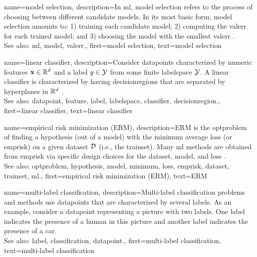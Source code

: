 {name={model selection},
	description={In \gls{ml}, \gls{model} selection refers to the 
		process of choosing between different candidate \glspl{model}. In its most 
		basic form, \gls{model} selection amounts to: 1) training each candidate \gls{model}; 
		2) computing the \gls{valerr} for each trained \gls{model}; and 3) choosing the \gls{model} 
		with the smallest \gls{valerr} \cite[Ch. 6]{MLBasics}. 
				\\
		See also: \gls{ml}, \gls{model}, \gls{valerr}.},
	first={model selection},
	text={model selection}  
}


{name={linear classifier}, 
	description={Consider \glspl{datapoint} characterized by numeric \glspl{feature} ${\bf x} \in \mathbb{R}^{d}$ 
	    	and a \gls{label} $y \in \mathcal{Y}$ from some finite \gls{labelspace} $\mathcal{Y}$. 
		A linear \gls{classifier} is characterized by having \glspl{decisionregion} that are 
		separated by hyperplanes in $\mathbb{R}^{d}$ \cite[Ch. 2]{MLBasics}.
				\\
		See also: \gls{datapoint}, \gls{feature}, \gls{label}, \gls{labelspace}, \gls{classifier}, \gls{decisionregion}.},
	first={linear classifier},
	text={linear classifier} 
}


{name={empirical risk minimization (ERM)}, 
	description={ERM is the \gls{optproblem} of finding 
		a \gls{hypothesis} (out of a \gls{model}) with the \gls{minimum} average \gls{loss} (or \gls{emprisk}) on a given \gls{dataset} 
		$\mathcal{D}$ (i.e., the \gls{trainset}). Many \gls{ml} methods are obtained from 
		\gls{emprisk} via specific design choices for the \gls{dataset}, \gls{model}, and \gls{loss} \cite[Ch. 3]{MLBasics}.
				\\
		See also: \gls{optproblem}, \gls{hypothesis}, \gls{model}, \gls{minimum}, \gls{loss}, \gls{emprisk}, \gls{dataset}, \gls{trainset}, \gls{ml}.},
	first={empirical risk minimization (ERM)},
	text={ERM} 
}


{name={multi-label classification}, 
	description={Multi-\gls{label} 
		\gls{classification} problems and methods use \glspl{datapoint} 
		that are characterized by several \glspl{label}. As an example, consider a \gls{datapoint} 
		representing a picture with two \glspl{label}. One \gls{label} indicates the presence of a human 
		in this picture and another \gls{label} indicates the presence of a car.
				\\
		See also: \gls{label}, \gls{classification}, \gls{datapoint}.},
	    first={multi-label classification},
	    text={multi-label classification} 
}


